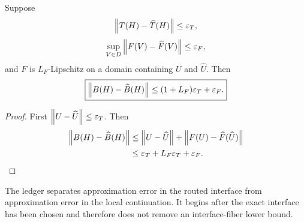 \begin{proposition}\label{prop:supp-block-error-ledger}
Suppose
\[
\left\lVert T(H)-\widehat T(H)\right\rVert\le\varepsilon_T,
\]
\[
\sup_{V\in D}\left\lVert F(V)-\widehat F(V)\right\rVert\le\varepsilon_F,
\]
and $F$ is $L_F$-Lipschitz on a domain containing $U$ and $\widehat U$. Then
\[
\boxed{
\left\lVert B(H)-\widehat B(H)\right\rVert
\le(1+L_F)\varepsilon_T+\varepsilon_F.
}
\]
\end{proposition}

\begin{proof}
First $\left\lVert U-\widehat U\right\rVert\le\varepsilon_T$. Then
\[
\begin{aligned}
\left\lVert B(H)-\widehat B(H)\right\rVert
&\le\left\lVert U-\widehat U\right\rVert
+\left\lVert F(U)-\widehat F(\widehat U)\right\rVert\\
&\le\varepsilon_T+L_F\varepsilon_T+\varepsilon_F.
\end{aligned}
\]
\end{proof}

The ledger separates approximation error in the routed interface from approximation error in the local continuation. It begins after the exact interface has been chosen and therefore does not remove an interface-fiber lower bound.
